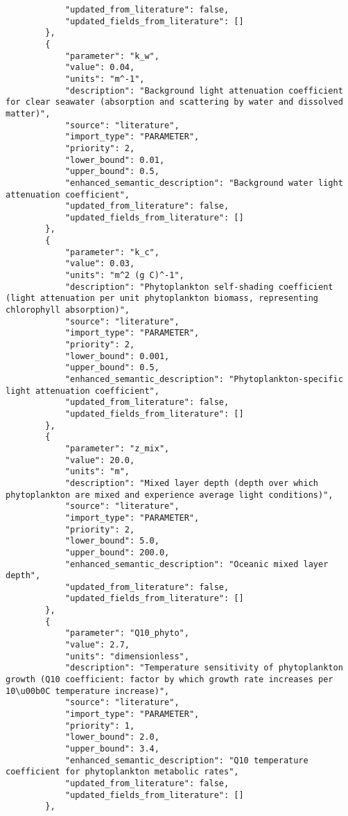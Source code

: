 \begin{lstlisting}
            "updated_from_literature": false,
            "updated_fields_from_literature": []
        },
        {
            "parameter": "k_w",
            "value": 0.04,
            "units": "m^-1",
            "description": "Background light attenuation coefficient for clear seawater (absorption and scattering by water and dissolved matter)",
            "source": "literature",
            "import_type": "PARAMETER",
            "priority": 2,
            "lower_bound": 0.01,
            "upper_bound": 0.5,
            "enhanced_semantic_description": "Background water light attenuation coefficient",
            "updated_from_literature": false,
            "updated_fields_from_literature": []
        },
        {
            "parameter": "k_c",
            "value": 0.03,
            "units": "m^2 (g C)^-1",
            "description": "Phytoplankton self-shading coefficient (light attenuation per unit phytoplankton biomass, representing chlorophyll absorption)",
            "source": "literature",
            "import_type": "PARAMETER",
            "priority": 2,
            "lower_bound": 0.001,
            "upper_bound": 0.5,
            "enhanced_semantic_description": "Phytoplankton-specific light attenuation coefficient",
            "updated_from_literature": false,
            "updated_fields_from_literature": []
        },
        {
            "parameter": "z_mix",
            "value": 20.0,
            "units": "m",
            "description": "Mixed layer depth (depth over which phytoplankton are mixed and experience average light conditions)",
            "source": "literature",
            "import_type": "PARAMETER",
            "priority": 2,
            "lower_bound": 5.0,
            "upper_bound": 200.0,
            "enhanced_semantic_description": "Oceanic mixed layer depth",
            "updated_from_literature": false,
            "updated_fields_from_literature": []
        },
        {
            "parameter": "Q10_phyto",
            "value": 2.7,
            "units": "dimensionless",
            "description": "Temperature sensitivity of phytoplankton growth (Q10 coefficient: factor by which growth rate increases per 10\u00b0C temperature increase)",
            "source": "literature",
            "import_type": "PARAMETER",
            "priority": 1,
            "lower_bound": 2.0,
            "upper_bound": 3.4,
            "enhanced_semantic_description": "Q10 temperature coefficient for phytoplankton metabolic rates",
            "updated_from_literature": false,
            "updated_fields_from_literature": []
        },

\end{lstlisting}
